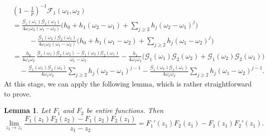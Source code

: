 \documentclass[12pt]{amsart}
\theoremstyle{plain}
\newtheorem{lem}{Lemma}[subsection]
\theoremstyle{definition}
\begin{document}
    \begin{equation}\label{eq:A1 before lemma}
    \begin{split}
    &\left(1-\frac{1}{p}\right)^{-1}\mathscr{F}_1(\omega_1,\omega_2)
    \\
    &=\frac{\mathcal{G}_1(\omega_1)\mathcal{G}_2(\omega_2)}{4\omega_1\omega_2(\omega_1-\omega_2)}
    \bigg(h_0+h_1(\omega_2-\omega_1)+\sum_{j\geq2}h_j(\omega_2-\omega_1)^j\bigg)
    \\& \hspace{1cm} -\frac{\mathcal{G}_1(\omega_2)\mathcal{G}_2(\omega_1)}{4\omega_1\omega_2(\omega_1-\omega_2)} \bigg(h_0+h_1(\omega_1-\omega_2)+\sum_{j\geq2}h_j(\omega_1-\omega_2)^j\bigg)\\
    &=\frac{h_0}{4\omega_1\omega_2}\, \frac{\mathcal{G}_1(\omega_1)\mathcal{G}_2(\omega_2)-\mathcal{G}_1(\omega_2)
    \mathcal{G}_2(\omega_1)}{\omega_1-\omega_2}
    -\frac{h_1}{4\omega_1\omega_2}\big(\mathcal{G}_1(\omega_1)\mathcal{G}_2(\omega_2)+\mathcal{G}_1(\omega_2)\mathcal{G}_2(\omega_1)\big)\\
    &\quad -\frac{\mathcal{G}_1(\omega_1)\mathcal{G}_2(\omega_2)}{4\omega_1\omega_2}\sum_{j\geq2}h_j(\omega_2-\omega_1)^{j-1}-\frac{\mathcal{G}_1(\omega_2)\mathcal{G}_2(\omega_1)}{4\omega_1\omega_2}\sum_{j\geq2}h_j(\omega_1-\omega_2)^{j-1} .
    \end{split}
    \end{equation}
At this stage, we can apply the following lemma, which is rather straightforward to prove. 


\begin{lem}
Let $F_1$ and $F_2$ be entire functions. Then 
        \[
        \lim_{z_2\to z_1} \frac{F_1(z_1)F_2(z_2)-F_1(z_2) F_2(z_1)}{z_1-z_2}
         =   F_1'(z_1) F_2(z_1) -F_1(z_1) F_2'(z_1).
         \]
 \end{lem} 
 
\end{document}
